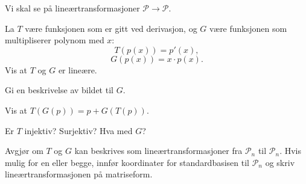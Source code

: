 \begin{oppgave}
Vi skal se på lineærtransformasjoner $\mathcal{P}\rightarrow \mathcal{P}$.

\begin{punkt}
La $T$ være funksjonen som er gitt ved derivasjon, og $G$ være funksjonen som multipliserer polynom med $x$:
$$T(p(x))=p'(x),$$
$$G(p(x))=x\cdot p(x).$$ Vis at $T$ og $G$ er lineære.

\end{punkt}


\begin{punkt}
Gi en beskrivelse av bildet til $G$.
\end{punkt}

\begin{punkt}
Vis at $T(G(p))=p+G(T(p))$.
\end{punkt}

\begin{punkt}
Er $T$ injektiv? Surjektiv? Hva med $G$?
\end{punkt}

\begin{punkt}
Avgjør om $T$ og $G$ kan beskrives som lineærtransformasjoner fra $\mathcal{P}_n$ til $\mathcal{P}_n$. Hvis mulig for en eller begge, innfør koordinater for standardbasisen til $\mathcal{P}_n$ og skriv lineærtransformasjonen på matriseform.
\end{punkt}

\end{oppgave}


